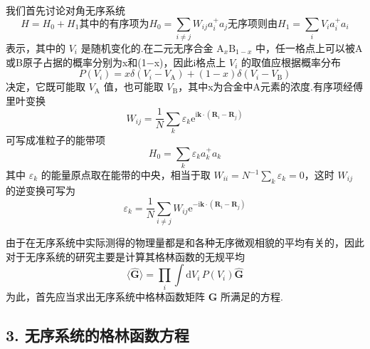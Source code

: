 我们首先讨论对角无序系统
\begin{subequations}
\begin{equation}
  H=H_{0}+H_{1}
\end{equation}
其中的有序项为
\begin{equation}
  H_{0}=\sum_{i\neq j}W_{ij}a_{i}^{+}a_{j}
\end{equation}
无序项则由
\begin{equation}
  H_{1}=\sum_{i}V_{i}a_{i}^{+}a_{i}
\end{equation}
\end{subequations}
表示，其中的 $V_{i}$ 是随机变化的.在二元无序合金 $\mathrm{A}_{x}\mathrm{B}_{1-x}$ 中，任一格点上可以被A或B原子占据的概率分别为x和(1−x)，因此i格点上 $V_{i}$ 的取值应根据概率分布
\begin{equation}
  P\left(V_{i}\right)=x\delta\left(V_{i}-V_{\mathrm{A}}\right)+\left(1-x\right)\delta\left(V_{i}-V_{\mathrm{B}}\right)
\end{equation}
决定，它既可能取 $V_{\mathrm{A}}$ 值，也可能取 $V_{\mathrm{B}}$，其中x为合金中A元素的浓度.有序项经傅里叶变换
\begin{equation*}
  W_{ij}=\frac{1}{N}\sum_{k}\varepsilon_{k}
  \mathrm{e}^{\mathrm{i}\boldsymbol{k}\cdot\left(\boldsymbol{R}_{i}-\boldsymbol{R}_{j}\right)}
\end{equation*}
可写成准粒子的能带项
\begin{equation}
  H_{0}=\sum_{k}\varepsilon_{k}a_{k}^{+}a_{k}
\end{equation}
其中 $\varepsilon_{k}$ 的能量原点取在能带的中央，相当于取 $W_{ii}=N^{-1}\sum_{k}\varepsilon_{k}=0$，这时 $W_{ij}$ 的逆变换可写为
\begin{equation}
  \varepsilon_{k}=\frac{1}{N}\sum_{i\neq j}W_{ij}
  \mathrm{e}^{-\mathrm{i}\boldsymbol{k}\cdot\left(\boldsymbol{R}_{i}-\boldsymbol{R}_{j}\right)}
\end{equation}

由于在无序系统中实际测得的物理量都是和各种无序微观相貌的平均有关的，因此对于无序系统的研究主要是计算其格林函数的无规平均
\begin{equation}
  \langle\hat{\boldsymbol{G}}\rangle=\prod_{i}\int\mathrm{d}V_{i}\,P\left(V_{i}\right)\hat{\boldsymbol{G}}
\end{equation}
为此，首先应当求出无序系统中格林函数矩阵 $\hat{\boldsymbol{G}}$ 所满足的方程.

\subsection*{3. 无序系统的格林函数方程}

